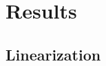 \documentclass[11pt]{article}
\begin{document}




\section{Results}
\subsection{Linearization}

\end{document}

